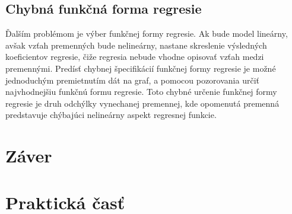 \documentclass[]{tukediphc}
\begin{document}
\subsection{Chybná funkčná forma regresie}

Ďalším problémom je výber funkčnej formy regresie. Ak bude model lineárny, avšak vzťah premenných bude nelineárny, nastane skreslenie výsledných koeficientov regresie, čiže regresia nebude vhodne opisovať vzťah medzi premennými. Predísť chybnej špecifikácií funkčnej formy regresie je možné jednoduchým premietnutím dát na graf, a pomocou pozorovania určiť najvhodnejšiu funkčnú formu regresie. Toto chybné určenie funkčnej formy regresie je druh odchýlky vynechanej premennej, kde opomenutá premenná predstavuje chýbajúci nelineárny aspekt regresnej funkcie. 

\section{Záver}

\section{Praktická časť}




%

%

%

%


\newpage
{}
\protect\label{page:posledna}
\end{document}
